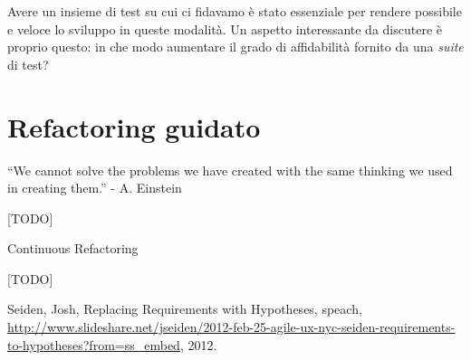 \documentclass[12pt]{report}
\begin{document}
Avere un insieme di test su cui ci fidavamo è stato essenziale per rendere possibile e veloce lo sviluppo in queste modalità. Un aspetto interessante da discutere è proprio questo: in che modo aumentare il grado di affidabilità fornito da una \textit{suite} di test?



% 
\chapter{Refactoring guidato}

``We cannot solve the problems we have created
with the same thinking we used in creating them.'' - A. Einstein


[TODO]

Continuous Refactoring

[TODO]

%
%

%
%
\begin{thebibliography}{00}
%
Seiden, Josh, Replacing Requirements with Hypotheses, speach, \url{http://www.slideshare.net/jseiden/2012-feb-25-agile-ux-nyc-seiden-requirements-to-hypotheses?from=ss_embed}, 2012.
%
\end{thebibliography}
% 
\end{document}
